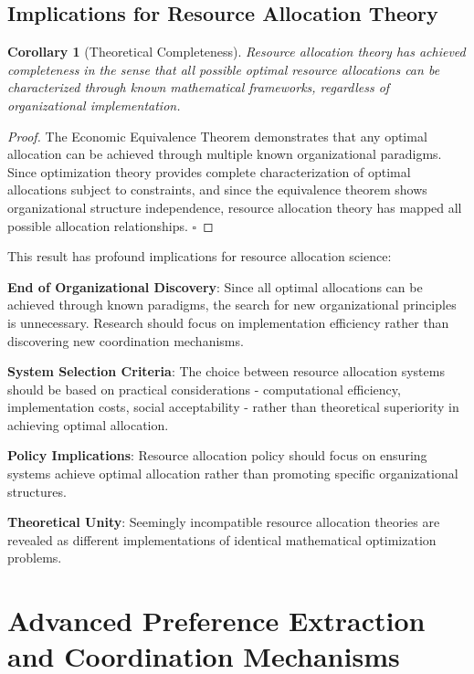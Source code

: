 \documentclass[12pt,a4paper]{article}
\newtheorem{corollary}[theorem]{Corollary}
\begin{document}
\subsection{Implications for Resource Allocation Theory}

\begin{corollary}[Theoretical Completeness]
Resource allocation theory has achieved completeness in the sense that all possible optimal resource allocations can be characterized through known mathematical frameworks, regardless of organizational implementation.
\end{corollary}

\begin{proof}
The Economic Equivalence Theorem demonstrates that any optimal allocation can be achieved through multiple known organizational paradigms. Since optimization theory provides complete characterization of optimal allocations subject to constraints, and since the equivalence theorem shows organizational structure independence, resource allocation theory has mapped all possible allocation relationships. $\square$
\end{proof}

This result has profound implications for resource allocation science:

\textbf{End of Organizational Discovery}: Since all optimal allocations can be achieved through known paradigms, the search for new organizational principles is unnecessary. Research should focus on implementation efficiency rather than discovering new coordination mechanisms.

\textbf{System Selection Criteria}: The choice between resource allocation systems should be based on practical considerations - computational efficiency, implementation costs, social acceptability - rather than theoretical superiority in achieving optimal allocation.

\textbf{Policy Implications}: Resource allocation policy should focus on ensuring systems achieve optimal allocation rather than promoting specific organizational structures.

\textbf{Theoretical Unity}: Seemingly incompatible resource allocation theories are revealed as different implementations of identical mathematical optimization problems.

\section{Advanced Preference Extraction and Coordination Mechanisms}
\end{document}
